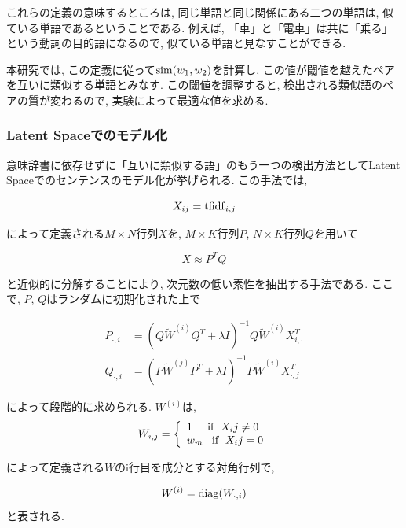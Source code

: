 \documentclass[12pt]{jarticle}
\begin{document}
これらの定義の意味するところは, 同じ単語と同じ関係にある二つの単語は, 似ている単語であるということである. 例えば, 「車」と「電車」は共に「乗る」という動詞の目的語になるので, 似ている単語と見なすことができる. 

本研究では, この定義に従って${\rm sim}(w_1, w_2)$を計算し, この値が閾値を越えたペアを互いに類似する単語とみなす. この閾値を調整すると, 検出される類似語のペアの質が変わるので, 実験によって最適な値を求める. 

\subsubsection{Latent Spaceでのモデル化}
意味辞書に依存せずに「互いに類似する語」のもう一つの検出方法としてLatent Spaceでのセンテンスのモデル化\cite{LatentSpace}が挙げられる. この手法では, 

\begin{equation}
  X_{ij} = {\rm tfidf}_{i,j}
\end{equation}

によって定義される$M \times N$行列$X$を, $M \times K$行列$P$, $N \times K$行列$Q$を用いて

\begin{equation}
  X \approx P^T Q
\end{equation}

と近似的に分解することにより, 次元数の低い素性を抽出する手法である. ここで, $P$, $Q$はランダムに初期化された上で

\begin{align}
  P_{\cdot ,i} &= (Q\tilde W^{(i)}Q^T + \lambda I)^{-1} Q \tilde W^{(i)} X_{i, \cdot }^T \\
  Q_{\cdot ,i} &= (P\tilde W^{(j)}P^T + \lambda I)^{-1} P \tilde W^{(i)} X_{\cdot , j}^T
\end{align}

によって段階的に求められる. $W^{(i)}$は, 
\begin{displaymath}
W_{i,j} = \left\{
\begin{array}{l}
1\;\;\;\;\;{\rm if} \;\; X_ij \neq 0 \\
w_m\;\;\;{\rm if} \;\; X_ij = 0
\end{array}
\right.
\end{displaymath}

によって定義される$W$のi行目を成分とする対角行列で, 

\begin{equation}
  W^{(i)} = {\rm diag}(W_{\cdot, i})
\end{equation}
と表される. 
\end{document}
